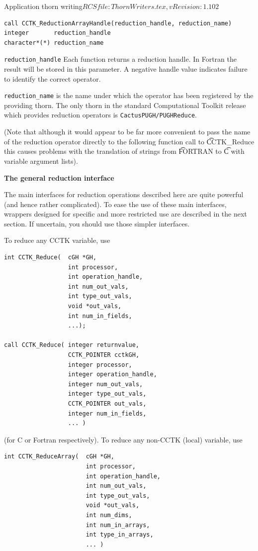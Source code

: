 \begin{cactuspart}{2}{Application thorn writing}{$RCSfile: ThornWriters.tex,v $}{$Revision: 1.102 $}
\begin{verbatim}
call CCTK_ReductionArrayHandle(reduction_handle, reduction_name)
integer       reduction_handle
character*(*) reduction_name
\end{verbatim}

\begin{Lentry}
\item[{\tt reduction\_handle}] Each function returns a reduction
handle.  In Fortran the result will be stored in this parameter.
A negative handle value indicates failure to
identify the correct operator.

\item[{\tt reduction\_name}]
is the name under which the operator has
been registered by the providing thorn. The only thorn in the standard
Computational Toolkit release which provides reduction operators is
{\tt CactusPUGH/PUGHReduce}.
\end{Lentry}

(Note that although it would appear to be far more convenient to
pass the name of the reduction operator directly to the following
function call to {\t CCTK\_Reduce} this causes problems with the
translation of strings from {\t FORTRAN} to {\t C} with variable
argument lists).


\vskip 0.24cm
{\bf The general reduction interface}

The main interfaces for reduction operations described here are quite
powerful (and hence rather complicated).  To ease the use of these
main interfaces, wrappers designed for specific and more restricted
use are described in the next section.  If uncertain, you should use
those simpler interfaces.

To reduce any CCTK variable, use
\begin{verbatim}
int CCTK_Reduce(  cGH *GH,
                  int processor,
                  int operation_handle,
                  int num_out_vals,
                  int type_out_vals,
                  void *out_vals,
                  int num_in_fields,
                  ...);

call CCTK_Reduce( integer returnvalue,
                  CCTK_POINTER cctkGH,
                  integer processor,
                  integer operation_handle,
                  integer num_out_vals,
                  integer type_out_vals,
                  CCTK_POINTER out_vals,
                  integer num_in_fields,
                  ... )
\end{verbatim}
(for C or Fortran respectively).
To reduce any non-CCTK (local) variable, use
\begin{verbatim}
int CCTK_ReduceArray(  cGH *GH,
                       int processor,
                       int operation_handle,
                       int num_out_vals,
                       int type_out_vals,
                       void *out_vals,
                       int num_dims,
                       int num_in_arrays,
                       int type_in_arrays,
                       ... )


\end{verbatim}
\end{cactuspart}
